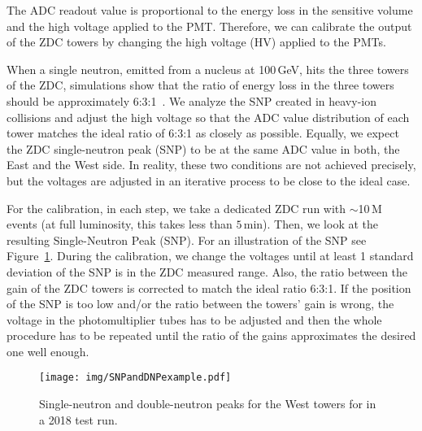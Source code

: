 The ADC readout value is proportional to the energy loss in the sensitive volume and the high voltage applied to the PMT\@. Therefore, we can calibrate the output of the ZDC towers by changing the high voltage (HV) applied to the PMTs. 

When a single neutron, emitted from a nucleus at 100$\,$GeV, hits the three towers of the ZDC, simulations show that the ratio of energy loss
in the three towers should be 
approximately 6:3:1~\cite{ZDCphysics}\@. We analyze the SNP created in heavy-ion collisions and adjust the high voltage so that the ADC value 
distribution of each tower matches the ideal ratio of 6:3:1 as closely as possible. Equally, we expect the ZDC 
single-neutron peak (SNP) to
be at the same ADC value in both, the East and the West side. In reality, these two conditions are not achieved precisely, but the voltages are adjusted in an iterative process to be close to the ideal case.



% 



For the calibration, in each step, we take a dedicated ZDC run with
$\sim$10$\,$M events (at full luminosity, this takes less than $5\,$min). Then, we
look at the resulting Single-Neutron Peak (SNP).
For an illustration of the SNP see Figure~\ref{SNPillustration}\@.
During the calibration, we change the voltages until at least 1 standard deviation of the SNP is in the ZDC measured
range. Also, the ratio between the gain of the ZDC towers is corrected to match the ideal ratio 6:3:1\@. If the position of the SNP is too low and/or the ratio between the towers' gain is wrong,
the voltage in the photomultiplier tubes has to be adjusted and then the whole procedure
has to be repeated until the ratio of the gains approximates the desired one well enough.


\begin{figure}[htb]
\begin{center}
\texttt{[image: img/SNPandDNPexample.pdf]}
\end{center}
\caption{\label{SNPillustration} Single-neutron and double-neutron peaks for the West towers for in a 2018 test run.}

\end{figure}

